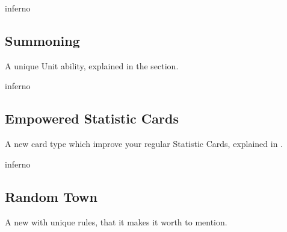 \begin{multicols*}{2}
\vspace*{1em}
\begin{expansion}{inferno}
	\subsection*{Summoning}
	A unique Unit ability, explained in the  section.
\end{expansion}

\vspace*{1em}
\begin{expansion}{inferno}
	\subsection*{Empowered Statistic Cards}
	A new card type which improve your regular Statistic Cards, explained in .
\end{expansion}

\vspace*{1em}
\begin{expansion}{inferno}
	\subsection*{Random Town}
	A new  with unique rules, that it makes it worth to mention.
\end{expansion}
\end{multicols*}

